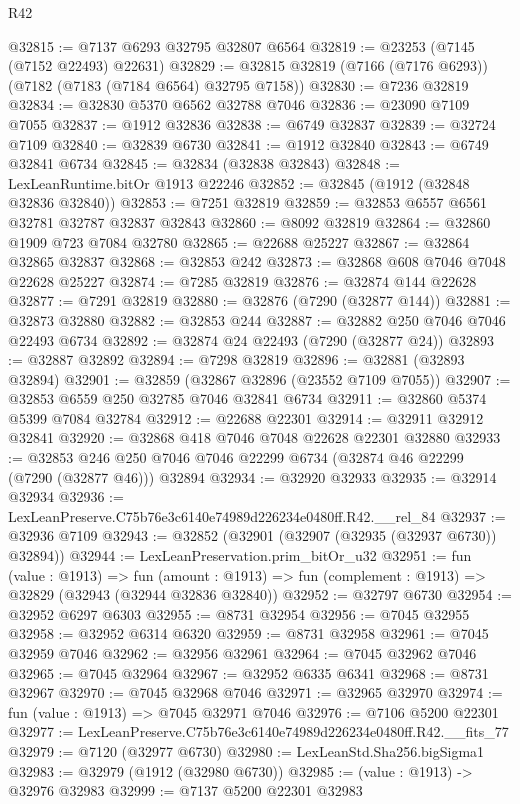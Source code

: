 \begin{lexlean}{R42}
\begin{coremodule}
{@32815 := @7137 @6293 @32795 @32807 @6564
@32819 := @23253 (@7145 (@7152 @22493) @22631)
@32829 := @32815 @32819 (@7166 (@7176 @6293)) (@7182 (@7183 (@7184 @6564) @32795 @7158))
@32830 := @7236 @32819
@32834 := @32830 @5370 @6562 @32788 @7046
@32836 := @23090 @7109 @7055
@32837 := @1912 @32836
@32838 := @6749 @32837
@32839 := @32724 @7109
@32840 := @32839 @6730
@32841 := @1912 @32840
@32843 := @6749 @32841 @6734
@32845 := @32834 (@32838 @32843)
@32848 := LexLeanRuntime.bitOr @1913 @22246
@32852 := @32845 (@1912 (@32848 @32836 @32840))
@32853 := @7251 @32819
@32859 := @32853 @6557 @6561 @32781 @32787 @32837 @32843
@32860 := @8092 @32819
@32864 := @32860 @1909 @723 @7084 @32780
@32865 := @22688 @25227
@32867 := @32864 @32865 @32837
@32868 := @32853 @242
@32873 := @32868 @608 @7046 @7048 @22628 @25227
@32874 := @7285 @32819
@32876 := @32874 @144 @22628
@32877 := @7291 @32819
@32880 := @32876 (@7290 (@32877 @144))
@32881 := @32873 @32880
@32882 := @32853 @244
@32887 := @32882 @250 @7046 @7046 @22493 @6734
@32892 := @32874 @24 @22493 (@7290 (@32877 @24))
@32893 := @32887 @32892
@32894 := @7298 @32819
@32896 := @32881 (@32893 @32894)
@32901 := @32859 (@32867 @32896 (@23552 @7109 @7055))
@32907 := @32853 @6559 @250 @32785 @7046 @32841 @6734
@32911 := @32860 @5374 @5399 @7084 @32784
@32912 := @22688 @22301
@32914 := @32911 @32912 @32841
@32920 := @32868 @418 @7046 @7048 @22628 @22301 @32880
@32933 := @32853 @246 @250 @7046 @7046 @22299 @6734 (@32874 @46 @22299 (@7290 (@32877 @46))) @32894
@32934 := @32920 @32933
@32935 := @32914 @32934
@32936 := LexLeanPreserve.C75b76e3c6140e74989d226234e0480ff.R42.__rel_84
@32937 := @32936 @7109
@32943 := @32852 (@32901 (@32907 (@32935 (@32937 @6730)) @32894))
@32944 := LexLeanPreservation.prim_bitOr_u32
@32951 := fun (value : @1913) =>
  fun (amount : @1913) => fun (complement : @1913) => @32829 (@32943 (@32944 @32836 @32840))
@32952 := @32797 @6730
@32954 := @32952 @6297 @6303
@32955 := @8731 @32954
@32956 := @7045 @32955
@32958 := @32952 @6314 @6320
@32959 := @8731 @32958
@32961 := @7045 @32959 @7046
@32962 := @32956 @32961
@32964 := @7045 @32962 @7046
@32965 := @7045 @32964
@32967 := @32952 @6335 @6341
@32968 := @8731 @32967
@32970 := @7045 @32968 @7046
@32971 := @32965 @32970
@32974 := fun (value : @1913) => @7045 @32971 @7046
@32976 := @7106 @5200 @22301
@32977 := LexLeanPreserve.C75b76e3c6140e74989d226234e0480ff.R42.__fits_77
@32979 := @7120 (@32977 @6730)
@32980 := LexLeanStd.Sha256.bigSigma1
@32983 := @32979 (@1912 (@32980 @6730))
@32985 := (value : @1913) -> @32976 @32983
@32999 := @7137
    @5200
    @22301
    @32983
}
\end{coremodule}
\end{lexlean}
